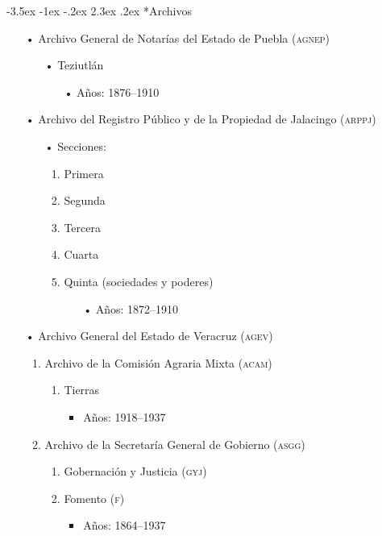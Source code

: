 \documentclass[14pt,twoside,final]{extbook} %
\makeatletter
\renewcommand\section{\@startsection {section}{1}{\z@}%
                                     {-3.5ex \@plus -1ex \@minus -.2ex}%
                                     {2.3ex \@plus .2ex}%
                                     {\normalfont\large\bfseries\sc}}
\makeatother
\begin{document}
\section*{Archivos}
\label{sec:archivos}
\begin{itemize}[noitemsep]
\item[•]Archivo General de Notarías del Estado de Puebla (\textsc{agnep})
\begin{itemize}[noitemsep]
\item[•]Teziutlán
\begin{itemize}[noitemsep]
\item[•]Años: 1876--1910
\end{itemize}
\end{itemize}
\end{itemize}
\begin{itemize}[noitemsep]
\item[•]Archivo del Registro Público y de la Propiedad de Jalacingo (\textsc{arppj})
\begin{itemize}[noitemsep]
\item[•]Secciones:
\begin{enumerate}[noitemsep]
\item Primera
\item Segunda
\item Tercera
\item Cuarta
\item Quinta (sociedades y poderes)
\begin{itemize}[noitemsep]
\item[•]Años: 1872--1910
\end{itemize}
\end{enumerate}
\end{itemize}
\end{itemize}
\begin{itemize}[noitemsep]
\item[•]Archivo General del Estado de Veracruz (\textsc{agev})
\begin{enumerate}[noitemsep]
\item Archivo de la Comisión Agraria Mixta (\textsc{acam})
\begin{enumerate}[noitemsep]
\item Tierras
\begin{itemize}[noitemsep]
\item Años: 1918--1937
\end{itemize}
\end{enumerate}
\item Archivo de la Secretaría General de Gobierno (\textsc{asgg})
\begin{enumerate}[noitemsep]
\item Gobernación y Justicia (\textsc{gyj})
\item Fomento (\textsc{f})
\begin{itemize}[noitemsep]
\item Años: 1864--1937
\end{itemize}
\end{enumerate}
\end{enumerate}
\end{itemize}
\end{document}
